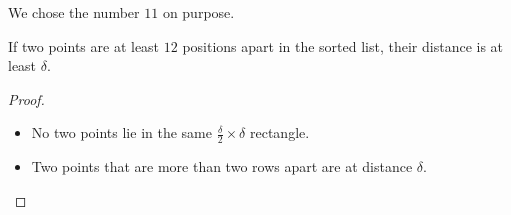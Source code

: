 \begin{remark}
    \begin{minipage}[t]{0.55\linewidth}
        We chose the number $11$ on purpose.

        \begin{claim}
            If two points are at least $12$ positions apart in the sorted list, their distance is at least $\delta$.
        \end{claim}

        \begin{proof}
            {~~~}

            \begin{itemize}
                \item No two points lie in the same $\frac{\delta}{2} \times \delta$ rectangle.

                \item Two points that are more than two rows apart are at distance $\delta$.
            \end{itemize}
        \end{proof}
    \end{minipage}
    \hfill
    \begin{minipage}[t]{0.4\linewidth}
        \begin{center}  \end{center}
    \end{minipage}
\end{remark}

